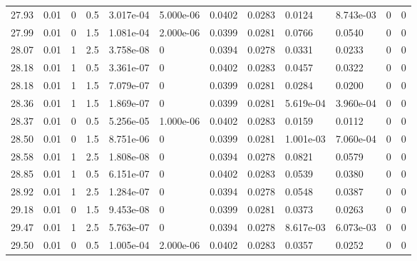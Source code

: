 \documentclass[preview]{standalone}
\begin{document}
{{{{\begin{tabular}{L{1.2cm}C{1.2cm} C{0.3cm}C{0.5cm} C{1.4cm}C{1.4cm} C{1.4cm}C{1.4cm} C{1.6cm}C{1.6cm} C{1.6cm}C{1.6cm}}
  27.93  &  0.01  & 0     & 0.5 &  3.017e-04  & 5.000e-06  &  0.0402&   0.0283& 0.0124 & 8.743e-03   &  0 & 0  \\ 
  27.99  &  0.01  & 0     & 1.5 &  1.081e-04  & 2.000e-06  &  0.0399&   0.0281& 0.0766 & 0.0540   &  0 & 0  \\ 
  28.07  &  0.01  & 1     & 2.5 &  3.758e-08  & 0  &  0.0394&   0.0278& 0.0331 & 0.0233   &  0 & 0  \\ 
  28.18  &  0.01  & 1     & 0.5 &  3.361e-07  & 0  &  0.0402&   0.0283& 0.0457 & 0.0322   &  0 & 0  \\ 
  28.18  &  0.01  & 1     & 1.5 &  7.079e-07  & 0  &  0.0399&   0.0281& 0.0284 & 0.0200   &  0 & 0  \\ 
  28.36  &  0.01  & 1     & 1.5 &  1.869e-07  & 0  &  0.0399&   0.0281& 5.619e-04 & 3.960e-04   &  0 & 0  \\ 
  28.37  &  0.01  & 0     & 0.5 &  5.256e-05  & 1.000e-06  &  0.0402&   0.0283& 0.0159 & 0.0112   &  0 & 0  \\ 
  28.50  &  0.01  & 0     & 1.5 &  8.751e-06  & 0  &  0.0399&   0.0281& 1.001e-03 & 7.060e-04   &  0 & 0  \\ 
  28.58  &  0.01  & 1     & 2.5 &  1.808e-08  & 0  &  0.0394&   0.0278& 0.0821 & 0.0579   &  0 & 0  \\ 
  28.85  &  0.01  & 1     & 0.5 &  6.151e-07  & 0  &  0.0402&   0.0283& 0.0539 & 0.0380   &  0 & 0  \\ 
  28.92  &  0.01  & 1     & 2.5 &  1.284e-07  & 0  &  0.0394&   0.0278& 0.0548 & 0.0387   &  0 & 0  \\ 
  29.18  &  0.01  & 0     & 1.5 &  9.453e-08  & 0  &  0.0399&   0.0281& 0.0373 & 0.0263   &  0 & 0  \\ 
  29.47  &  0.01  & 1     & 2.5 &  5.763e-07  & 0  &  0.0394&   0.0278& 8.617e-03 & 6.073e-03   &  0 & 0  \\ 
  29.50  &  0.01  & 0     & 0.5 &  1.005e-04  & 2.000e-06  &  0.0402&   0.0283& 0.0357 & 0.0252   &  0 & 0  \\ 
\hline 
\end{tabular} 

}}}}
\end{document}
